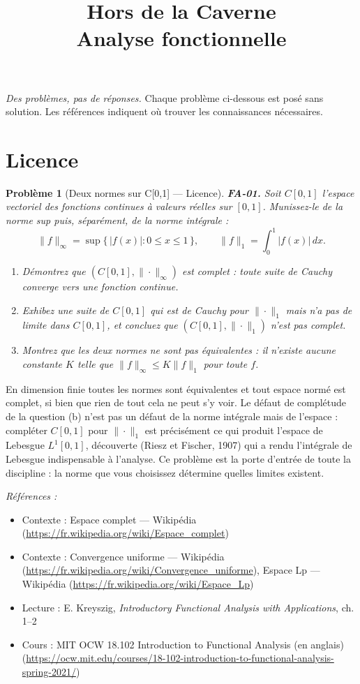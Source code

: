 \documentclass[11pt]{article}
\title{Hors de la Caverne \\ \Large Analyse fonctionnelle}
\author{}
\date{}
\newtheorem{problem}{Problème}
\newenvironment{refs}{\par\small\noindent\emph{Références :}\begin{itemize}\setlength\itemsep{0pt}}{\end{itemize}\normalsize}
\begin{document}
\maketitle
\noindent\emph{Des problèmes, pas de réponses.} Chaque problème ci-dessous est posé
sans solution. Les références indiquent où trouver les connaissances nécessaires.
\medskip


\section*{Licence}

\begin{problem}[{Deux normes sur C[0,1] --- Licence}]
\textbf{FA-01.} Soit $ C[0,1] $ l'espace vectoriel des fonctions continues à valeurs réelles
sur $ [0,1] $. Munissez-le de la norme sup puis, séparément, de la norme intégrale :
\[ \|f\|_\infty = \sup\{\,|f(x)| : 0 \le x \le 1\,\}, \qquad \|f\|_1 = \int_0^1 |f(x)|\,dx . \]
\begin{enumerate}
\item[(a)] Démontrez que $ (C[0,1], \|\cdot\|_\infty) $ est complet : toute suite de Cauchy converge vers
une fonction continue.
\item[(b)] Exhibez une suite de $ C[0,1] $ qui est de Cauchy pour $ \|\cdot\|_1 $ mais n'a pas de limite
dans $ C[0,1] $, et concluez que $ (C[0,1], \|\cdot\|_1) $ n'est pas complet.
\item[(c)] Montrez que les deux normes ne sont pas équivalentes : il n'existe aucune constante $ K $ telle
que $ \|f\|_\infty \le K\|f\|_1 $ pour toute $ f $.
\end{enumerate}

\end{problem}

\noindent En dimension finie toutes les normes sont équivalentes et tout espace normé est
complet, si bien que rien de tout cela ne peut s'y voir. Le défaut de complétude de la question (b)
n'est pas un défaut de la norme intégrale mais de l'espace : compléter $ C[0,1] $ pour
$ \|\cdot\|_1 $ est précisément ce qui produit l'espace de Lebesgue $ L^1[0,1] $, découverte
(Riesz et Fischer, 1907) qui a rendu l'intégrale de Lebesgue indispensable à l'analyse. Ce problème
est la porte d'entrée de toute la discipline : la norme que vous choisissez détermine quelles limites
existent.

\begin{refs}
\item Contexte : Espace complet --- Wikipédia (\url{https://fr.wikipedia.org/wiki/Espace_complet})
\item Contexte : Convergence uniforme --- Wikipédia (\url{https://fr.wikipedia.org/wiki/Convergence_uniforme}), Espace Lp --- Wikipédia (\url{https://fr.wikipedia.org/wiki/Espace_Lp})
\item Lecture : E. Kreyszig, \textit{Introductory Functional Analysis with Applications}, ch. 1--2
\item Cours : MIT OCW 18.102 Introduction to Functional Analysis (en anglais) (\url{https://ocw.mit.edu/courses/18-102-introduction-to-functional-analysis-spring-2021/})
\end{refs}
\end{document}
